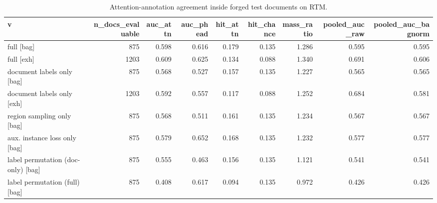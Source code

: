 \begin{table}[t]
\centering
\caption{Attention-annotation agreement inside forged test documents on RTM.}
\label{tab:rtm_loc}
\begin{tabular}{lrrrrrrrr}
\toprule
v & n\_docs\_evaluable & auc\_attn & auc\_phead & hit\_attn & hit\_chance & mass\_ratio & pooled\_auc\_raw & pooled\_auc\_bagnorm \\
\midrule
full [bag] & 875 & 0.598 & 0.616 & 0.179 & 0.135 & 1.286 & 0.595 & 0.595 \\
full [exh] & 1203 & 0.609 & 0.625 & 0.134 & 0.088 & 1.340 & 0.691 & 0.606 \\
document labels only [bag] & 875 & 0.568 & 0.527 & 0.157 & 0.135 & 1.227 & 0.565 & 0.565 \\
document labels only [exh] & 1203 & 0.592 & 0.557 & 0.117 & 0.088 & 1.252 & 0.684 & 0.581 \\
region sampling only [bag] & 875 & 0.568 & 0.511 & 0.161 & 0.135 & 1.234 & 0.567 & 0.567 \\
aux. instance loss only [bag] & 875 & 0.579 & 0.652 & 0.168 & 0.135 & 1.232 & 0.577 & 0.577 \\
label permutation (doc-only) [bag] & 875 & 0.555 & 0.463 & 0.156 & 0.135 & 1.121 & 0.541 & 0.541 \\
label permutation (full) [bag] & 875 & 0.408 & 0.617 & 0.094 & 0.135 & 0.972 & 0.426 & 0.426 \\
\bottomrule
\end{tabular}
\end{table}